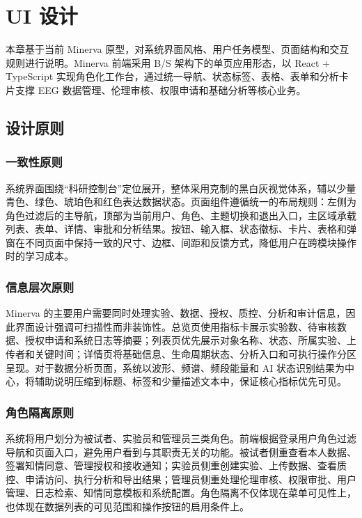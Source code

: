 \section{UI 设计}

本章基于当前 Minerva 原型，对系统界面风格、用户任务模型、页面结构和交互规则进行说明。Minerva 前端采用 B/S 架构下的单页应用形态，以 React + TypeScript 实现角色化工作台，通过统一导航、状态标签、表格、表单和分析卡片支撑 EEG 数据管理、伦理审核、权限申请和基础分析等核心业务。

\subsection{设计原则}

\subsubsection{一致性原则}

系统界面围绕``科研控制台''定位展开，整体采用克制的黑白灰视觉体系，辅以少量青色、绿色、琥珀色和红色表达数据状态。页面组件遵循统一的布局规则：左侧为角色过滤后的主导航，顶部为当前用户、角色、主题切换和退出入口，主区域承载列表、表单、详情、审批和分析结果。按钮、输入框、状态徽标、卡片、表格和弹窗在不同页面中保持一致的尺寸、边框、间距和反馈方式，降低用户在跨模块操作时的学习成本。

\subsubsection{信息层次原则}

Minerva 的主要用户需要同时处理实验、数据、授权、质控、分析和审计信息，因此界面设计强调可扫描性而非装饰性。总览页使用指标卡展示实验数、待审核数据、授权申请和系统日志等摘要；列表页优先展示对象名称、状态、所属实验、上传者和关键时间；详情页将基础信息、生命周期状态、分析入口和可执行操作分区呈现。对于数据分析页面，系统以波形、频谱、频段能量和 AI 状态识别结果为中心，将辅助说明压缩到标题、标签和少量描述文本中，保证核心指标优先可见。

\subsubsection{角色隔离原则}

系统将用户划分为被试者、实验员和管理员三类角色。前端根据登录用户角色过滤导航和页面入口，避免用户看到与其职责无关的功能。被试者侧重查看本人数据、签署知情同意、管理授权和接收通知；实验员侧重创建实验、上传数据、查看质控、申请访问、执行分析和导出结果；管理员侧重处理伦理审核、权限审批、用户管理、日志检索、知情同意模板和系统配置。角色隔离不仅体现在菜单可见性上，也体现在数据列表的可见范围和操作按钮的启用条件上。

